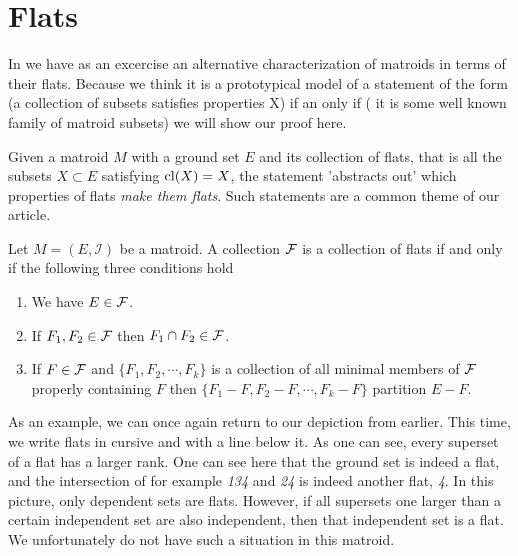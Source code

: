 \section{Flats}

In \cite[35]{oxley1} we have as an excercise an alternative characterization of matroids in terms of their flats. Because we think it is a prototypical model of a statement of the form (a collection of subsets satisfies properties X) if an only if ( it is some well known family of matroid subsets) we will show our proof here.

    Given a matroid $M$ with a ground set $E$ and its collection of flats, that is all the subsets $X \subset E$ satisfying $\mathrm{cl}(X) = X$, the statement 'abstracts out' which properties of flats \textit{make them flats}. Such statements are a common theme of our article.

\begin{theorem}
    Let $M = (E, \mathcal{I})$ be a matroid. A collection $\mathcal{F}$ is a collection of flats if and only if the following three conditions hold

    \begin{enumerate}
        \item We have $E \in \mathcal{F}$.
        \item If $F_1, F_2 \in \mathcal{F}$ then $F_1 \cap F_2 \in \mathcal{F}$.
        \item If $F \in \mathcal{F}$ and $\{F_1, F_2, \cdots, F_k\}$ is a collection of all minimal members of $\mathcal{F}$ properly containing $F$ then $\{F_1-F, F_2-F, \cdots, F_k - F\}$ partition $E-F$.
        
    \end{enumerate}
        
\end{theorem}

As an example, we can once again return to our depiction from earlier. This time, we write flats in cursive and with a line below it. As one can see, every superset of a flat has a larger rank. One can see here that the ground set is indeed a flat, and the intersection of for example \textit{134} and \textit{24} is indeed another flat, \textit{4}. In this picture, only dependent sets are flats. However, if all supersets one larger than a certain independent set are also independent, then that independent set is a flat. We unfortunately do not have such a situation in this matroid. 

